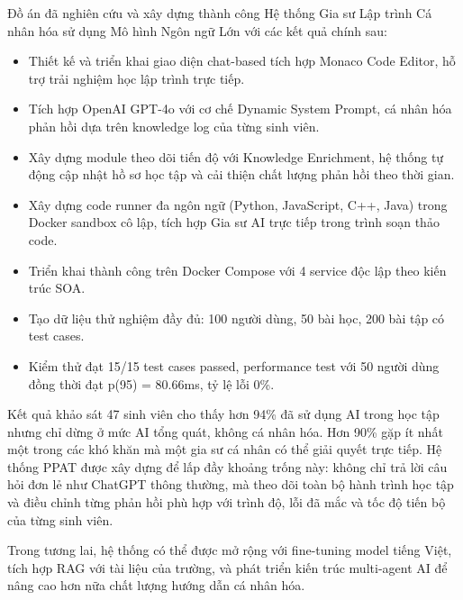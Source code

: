 \documentclass[../main.tex]{subfiles}
\begin{document}
Đồ án đã nghiên cứu và xây dựng thành công Hệ thống Gia sư Lập trình Cá nhân hóa sử dụng Mô hình Ngôn ngữ Lớn với các kết quả chính sau:

\begin{itemize}
    \item Thiết kế và triển khai giao diện chat-based tích hợp Monaco Code Editor, hỗ trợ trải nghiệm học lập trình trực tiếp.
    \item Tích hợp OpenAI GPT-4o với cơ chế Dynamic System Prompt, cá nhân hóa phản hồi dựa trên knowledge log của từng sinh viên.
    \item Xây dựng module theo dõi tiến độ với Knowledge Enrichment, hệ thống tự động cập nhật hồ sơ học tập và cải thiện chất lượng phản hồi theo thời gian.
    \item Xây dựng code runner đa ngôn ngữ (Python, JavaScript, C++, Java) trong Docker sandbox cô lập, tích hợp Gia sư AI trực tiếp trong trình soạn thảo code.
    \item Triển khai thành công trên Docker Compose với 4 service độc lập theo kiến trúc SOA.
    \item Tạo dữ liệu thử nghiệm đầy đủ: 100 người dùng, 50 bài học, 200 bài tập có test cases.
    \item Kiểm thử đạt 15/15 test cases passed, performance test với 50 người dùng đồng thời đạt p(95) = 80.66ms, tỷ lệ lỗi 0\%.
\end{itemize}

Kết quả khảo sát 47 sinh viên cho thấy hơn 94\% đã sử dụng AI trong học tập nhưng chỉ dừng ở mức AI tổng quát, không cá nhân hóa. Hơn 90\% gặp ít nhất một trong các khó khăn mà một gia sư cá nhân có thể giải quyết trực tiếp. Hệ thống PPAT được xây dựng để lấp đầy khoảng trống này: không chỉ trả lời câu hỏi đơn lẻ như ChatGPT thông thường, mà theo dõi toàn bộ hành trình học tập và điều chỉnh từng phản hồi phù hợp với trình độ, lỗi đã mắc và tốc độ tiến bộ của từng sinh viên.

Trong tương lai, hệ thống có thể được mở rộng với fine-tuning model tiếng Việt, tích hợp RAG với tài liệu của trường, và phát triển kiến trúc multi-agent AI để nâng cao hơn nữa chất lượng hướng dẫn cá nhân hóa.
\end{document}
